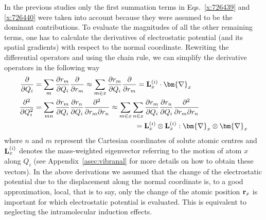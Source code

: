 \documentclass[b5paper,oneside,fleqn,11pt]{book}
\newcommand{\BM}[1]{\bm{#1}}
\newcommand{\fderiv}[2]{\ensuremath{
    \frac{\partial #1}{\partial #2}}}
\newcommand{\sderiv}[2]{\ensuremath{
    \frac{\partial^2 #1}{\partial #2^2}
    }}
\newcommand{\sderivd}[3]{\ensuremath{
    \frac{\partial^2 #1}{\partial #2 \partial #3}
    }}
\begin{document}
\begin{refsection}
In the previous studies only the first summation terms in 
Eqs.~\eqref{x:726439} and \eqref{x:726440} were taken into account because 
they were assumed to be the dominant contributions. To evaluate the
magnitudes of all the other remaining terms, one has to calculate
the derivatives of electrostatic potential (and its spatial gradients)
with respect to the normal coordinate. Rewriting the differential 
operators and using the chain rule, we can simplify the
derivative operators in the following way
%
\begin{subequations}  \label{e:deriv-operators}
\begin{align}
\fderiv{}{Q_i} &= \sum_m \fderiv{r_m}{Q_i}\fderiv{}{r_m} 
     \approx \sum_{m\in x} \fderiv{r_m}{Q_i}\fderiv{}{r_m} 
     = {\bf L}_x^{(i)} \cdot {\BM \nabla}_x      \label{e:deriv-operators-1} \\ \nonumber
\sderiv{}{Q_i} &= \sum_{mn} \fderiv{r_m}{Q_i}\fderiv{r_n}{Q_i}\sderivd{}{r_m}{r_n} 
     \approx \sum_{m\in x}\sum_{n\in x} \fderiv{r_m}{Q_i}\fderiv{r_n}{Q_i}\sderivd{}{r_m}{r_n} \\
     &\qquad\qquad\qquad\qquad\qquad\qquad\qquad
      = {\bf L}_x^{(i)} \otimes {\bf L}_x^{(i)} : {\BM \nabla}_x\otimes{\BM \nabla}_x  \label{e:deriv-operators-2}
\end{align}
\end{subequations}
%
where $n$ and $m$ represent the Cartesian coordinates of solute
atomic centres and ${\bf L}_x^{(i)}$ denotes the mass\hyp{}weighted
eigenvector referring to the motion of atom $x$ along $Q_i$
(see Appendix~\ref{asec:vibranal} for more details on how to obtain these vectors).
In the above derivations we assumed that the change of the electrostatic
potential due to the displacement along the normal coordinate is, 
to a good approximation, local, that is to say, only the change of the
atomic position ${\bf r}_x$ is important for which electrostatic potential 
is evaluated. This is equivalent to neglecting the intramolecular induction
effects.


\end{refsection}
\end{document}
